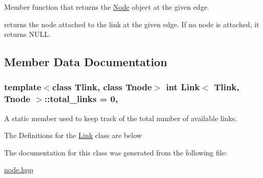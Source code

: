 Member function that returns the \hyperlink{classNode}{Node} object at the given edge. 

returns the node attached to the link at the given edge. If no node is attached, it returns N\-U\-L\-L. 

\subsection{Member Data Documentation}
\hypertarget{classLink_ad240a01b7643e780f7472bf5058f2151}{
\subsubsection[{total\-\_\-links}]{\setlength{\rightskip}{0pt plus 5cm}template$<$class Tlink, class Tnode$>$ int {\bf Link}$<$ Tlink, Tnode $>$\-::total\-\_\-links = 0\hspace{0.3cm}{\ttfamily [static]}, {\ttfamily [private]}}}\label{classLink_ad240a01b7643e780f7472bf5058f2151}


A static member used to keep track of the total number of available links. 

The Definitions for the \hyperlink{classLink}{Link} class are below 

The documentation for this class was generated from the following file\-:\begin{DoxyCompactItemize}
\item 
\hyperlink{node_8hpp}{node.\-hpp}\end{DoxyCompactItemize}
